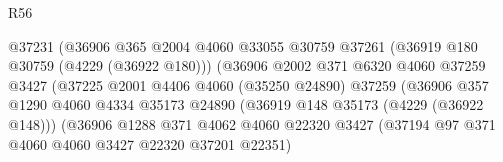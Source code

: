 \begin{lexlean}{R56}
\begin{coremodule}
                                          @37231
                                          (@36906
                                            @365
                                            @2004
                                            @4060
                                            @33055
                                            @30759
                                            @37261
                                            (@36919 @180 @30759 (@4229 (@36922 @180)))
                                            (@36906
                                              @2002
                                              @371
                                              @6320
                                              @4060
                                              @37259
                                              @3427
                                              (@37225
                                                @2001
                                                @4406
                                                @4060
                                                (@35250 @24890)
                                                @37259
                                                (@36906
                                                  @357
                                                  @1290
                                                  @4060
                                                  @4334
                                                  @35173
                                                  @24890
                                                  (@36919 @148 @35173 (@4229 (@36922 @148)))
                                                  (@36906
                                                    @1288
                                                    @371
                                                    @4062
                                                    @4060
                                                    @22320
                                                    @3427
                                                    (@37194
                                                      @97
                                                      @371
                                                      @4060
                                                      @4060
                                                      @3427
                                                      @22320
                                                      @37201
                                                      @22351)

\end{coremodule}
\end{lexlean}
